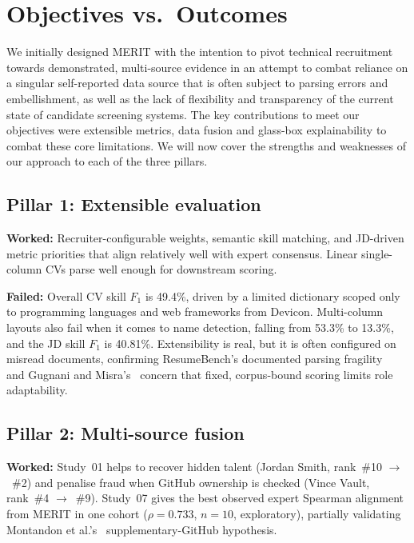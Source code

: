 \section{Objectives vs.\ Outcomes}
\label{sec:objectives-retrospective}

We initially designed MERIT with the intention to pivot technical recruitment towards demonstrated, multi-source evidence in an attempt
to combat reliance on a singular self-reported data source that is often subject to parsing errors and embellishment, as well as 
the lack of flexibility and transparency of the current state of candidate screening systems. The key contributions
to meet our objectives were extensible metrics, data fusion and glass-box explainability to combat these core limitations. 
We will now cover the strengths and weaknesses of our approach to each of the three pillars.

\subsection{Pillar 1: Extensible evaluation}

\textbf{Worked:} Recruiter-configurable weights, semantic skill matching, and JD-driven metric priorities that align relatively
well with expert consensus. Linear single-column CVs parse well enough for downstream scoring.

\textbf{Failed:} Overall CV skill $F_1$ is 49.4\%, driven by a limited dictionary scoped only to programming languages and web frameworks from Devicon.
Multi-column layouts also fail when it comes to name detection, falling from 53.3\% to 13.3\%, and the JD skill $F_1$ is 40.81\%.
Extensibility is real, but it is often configured on misread documents, confirming ResumeBench's documented parsing 
fragility~\cite{emnlp2025resumebench} and Gugnani and Misra's~\cite{gugnani2020} concern that fixed, corpus-bound 
scoring limits role adaptability.

\subsection{Pillar 2: Multi-source fusion}

\textbf{Worked:} Study~01 helps to recover hidden talent (Jordan Smith, rank~\#10 $\rightarrow$~\#2) and penalise fraud when GitHub ownership is checked
(Vince Vault, rank~\#4 $\rightarrow$~\#9). Study~07 gives the best observed expert Spearman alignment from MERIT in one cohort ($\rho = 0.733$, $n=10$,
exploratory), partially validating Montandon et al.'s~\cite{montandon2021_roles} supplementary-GitHub hypothesis.

